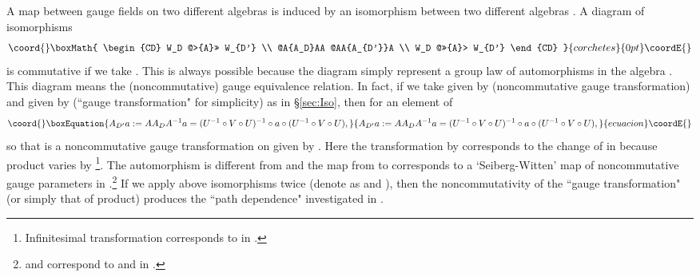\documentclass[10pt,a4paper]{article}
\def\h{\hbar}
\begin{document}
A map between gauge fields on two different algebras \myHighlight{$(C^\infty(M)[[\h]]\otimes {\cal A},*)$}\coordHE{} is induced by an isomorphism between two different algebras \coordHE{}. 
A diagram of isomorphisms 
\[\coord{}\boxMath{
\begin{CD}
W_D        @>{A}>>           W_{D'}   \\
@A{A_D}AA                      @AA{A_{D'}}A  \\
W_D        @>>{A}>           W_{D'}
\end{CD}
}{corchetes}{0pt}\coordE{}\]
is commutative if we take \coordHE{}. This is always possible because the diagram simply represent a group law of automorphisms in the algebra \coordHE{}. 
This diagram means the (noncommutative) gauge equivalence relation. In fact, if we take \coordHE{} given by \coordHE{} (noncommutative gauge transformation) and \coordHE{} given by \coordHE{} (``gauge transformation" for simplicity) as in \S\ref{sec:Iso}, then for an element of \coordHE{}
\begin{equation}\coord{}\boxEquation{
A_{D'}a:=AA_DA^{-1}a
=(U^{-1}\circ V\circ U)^{-1}\circ a \circ (U^{-1}\circ V\circ U),
}{
A_{D'}a:=AA_DA^{-1}a
=(U^{-1}\circ V\circ U)^{-1}\circ a \circ (U^{-1}\circ V\circ U),
}{ecuacion}\coordE{}\end{equation}
so that \coordHE{} is a noncommutative gauge transformation on \coordHE{} given by \coordHE{}. 
Here the transformation by \coordHE{} corresponds to the change of \myHighlight{$\vartheta^{\mu\nu}$}\coordHE{} in \cite{SW}\cite{AK} because \myHighlight{$*$}\coordHE{} product varies by \coordHE{}
\footnote{
Infinitesimal transformation \coordHE{} corresponds to \myHighlight{$\delta\theta$}\coordHE{} in \cite{AK}.
}.
The automorphism \coordHE{} is different from \coordHE{}
and the map from \coordHE{} to \coordHE{} corresponds to a `Seiberg-Witten' map of noncommutative gauge parameters in \cite{SW}\cite{AK}.\footnote{
\coordHE{} and \coordHE{} correspond to \myHighlight{${\hat \delta}_{\hat \lambda}$}\coordHE{} and \myHighlight{${\tilde \delta}_{\tilde \lambda}$}\coordHE{} in \cite{AK}.
} 
If we apply above isomorphisms twice (denote as \coordHE{} and \coordHE{}), then the noncommutativity \coordHE{} of the ``gauge transformation" (or simply that of \myHighlight{$\circ$}\coordHE{} product) produces the ``path dependence" investigated in \cite{AK}.\\
\end{document}
